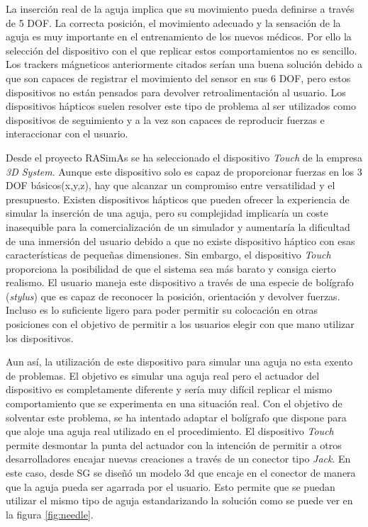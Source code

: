 La inserción real de la aguja implica que su movimiento pueda definirse a través de 5 \ac{DOF}. La correcta posición, el movimiento adecuado y la sensación de la aguja es muy importante en el entrenamiento de los nuevos médicos. Por ello la selección del dispositivo con el que replicar estos comportamientos no es sencillo. Los \ac{tracker}s mágneticos anteriormente citados serían una buena solución debido a que son capaces de registrar el movimiento del sensor en sus 6 \ac{DOF}, pero estos dispositivos no están pensados para devolver retroalimentación al usuario. Los dispositivos hápticos suelen resolver este tipo de problema al ser utilizados como dispositivos de seguimiento y a la vez son capaces de reproducir fuerzas e interaccionar con el usuario.

Desde el proyecto \ac{RASimAs} se ha seleccionado el dispositivo \emph{Touch} de la empresa \emph{3D System}\cite{asdf}. Aunque este dispositivo solo es capaz de proporcionar fuerzas en los 3 \ac{DOF} básicos(x,y,z), hay que alcanzar un compromiso entre versatilidad y el presupuesto. Existen dispositivos hápticos que pueden ofrecer la experiencia de simular la inserción de una aguja, pero su complejidad implicaría un coste inasequible para la comercialización de un simulador y aumentaría la dificultad de una inmersión del usuario debido a que no existe dispositivo háptico con esas características de pequeñas dimensiones. Sin embargo, el dispositivo \emph{Touch} proporciona la posibilidad de que el sistema sea más barato y consiga cierto realismo. 
El usuario maneja este dispositivo a través de una especie de bolígrafo (\emph{stylus}) que es capaz de reconocer la posición, orientación y devolver fuerzas. Incluso es lo suficiente ligero para poder permitir su colocación en otras posiciones con el objetivo de permitir a los usuarios elegir con que mano utilizar los dispositivos.

Aun así, la utilización de este dispositivo para simular una aguja no esta exento de problemas. El objetivo es simular una aguja real pero el actuador del dispositivo es completamente diferente y sería muy difícil replicar el mismo comportamiento que se experimenta en una situación real.
Con el objetivo de solventar este problema, se ha intentado adaptar el bolígrafo que dispone para que aloje una aguja real utilizado en el procedimiento.
El dispositivo \emph{Touch} permite desmontar la punta del actuador con la intención de permitir a otros desarrolladores encajar nuevas creaciones a través de un conector tipo \emph{Jack}. En este caso, desde \ac{SG} se diseñó un modelo 3d que encaje en el conector de manera que la aguja pueda ser agarrada por el usuario. Esto permite que se puedan utilizar el mismo tipo de aguja estandarizando la solución como se puede ver en la figura \ref{fig:needle}.

